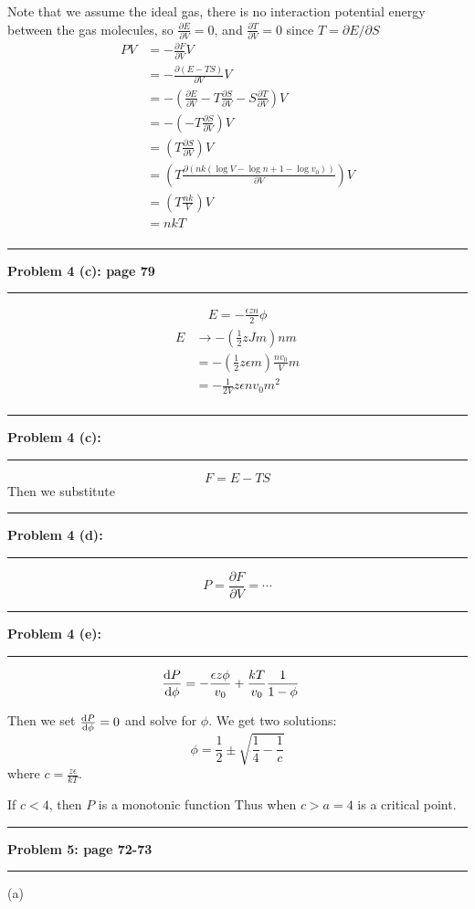 \documentclass[11pt]{article}
\newcommand\question[2]{\vspace{.25in}\hrule\textbf{#1: #2}\vspace{.5em}\hrule\vspace{.10in}}
\begin{document}
Note that we assume the ideal gas, there is no interaction potential energy between the gas molecules, 
so $\frac{\partial E}{\partial V} = 0$, and $\frac{\partial T}{\partial V} = 0$ since $T = \partial E/\partial S$
\begin{align*}
    PV &= -\frac{\partial F}{\partial V}V\\
       &= -\frac{\partial (E - TS)}{\partial V}V\\
       &= -\left(\frac{\partial E}{\partial V} - T\frac{\partial S}{\partial V}-S\frac{\partial T}{\partial V}\right)V\\
       &= -\left(-T\frac{\partial S}{\partial V}\right)V\\
       &= \left(T\frac{\partial S}{\partial V}\right)V\\
       &= \left(T\frac{\partial (nk(\log V - \log n + 1 - \log v_0))}{\partial V}\right)V\\
       &= \left(T\frac{nk}{V}\right)V\\
       &= nkT\\
\end{align*}

\question{Problem 4 (c)}{page 79}
\begin{align*}
    E = -\frac{\epsilon z n}{2}\phi
\end{align*}
\begin{align*}
    E &\to -\left(\frac{1}{2}zJm\right)n m\\
      &= -\left(\frac{1}{2}z\epsilon m\right)\frac{nv_0}{V} m\\
      &= -\frac{1}{2V}z\epsilon nv_0 m^2\\
\end{align*}

\question{Problem 4 (c)}{}
\[F = E-TS\]
Then we substitute

\question{Problem 4 (d)}{}
\[P = \frac{\partial F}{\partial V} = \cdots\]
\question{Problem 4 (e)}{}

\begin{align*}
    \frac{\mathrm{d} P}{\mathrm{d} \phi} &= -\frac{\epsilon z\phi}{v_0} + \frac{kT}{v_0}\frac{1}{1-\phi}
\end{align*}

Then we set $\frac{\mathrm{d} P}{\mathrm{d} \phi} = 0$ and solve for $\phi$.
We get two solutions:
\[\phi = \frac{1}{2}\pm \sqrt{\frac{1}{4}-\frac{1}{c}}\]
where $c = \frac{z\epsilon}{kT}$.

If $c < 4$, then $P$ is a monotonic function Thus when $c > a = 4$ is a critical point.

\question{Problem 5}{page 72-73}
(a)
\end{document}
